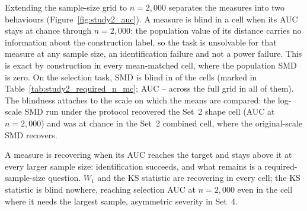 \documentclass[AMA,Times1COL]{WileyNJDv5}
\begin{document}
Extending the sample-size grid to $n = 2{,}000$ separates the measures into two behaviours (Figure~\ref{fig:study2_auc}). A measure is blind in a cell when its AUC stays at chance through $n = 2{,}000$: the population value of its distance carries no information about the construction label, so the task is unsolvable for that measure at any sample size, an identification failure and not a power failure. This is exact by construction in every mean-matched cell, where the population SMD is zero. On the selection task, SMD is blind in  of the  cells (marked in Table~\ref{tab:study2_required_n_mc}; AUC -- across the full grid in all of them). The blindness attaches to the scale on which the means are compared: the log-scale SMD run under the protocol recovered the Set~2 shape cell (AUC  at $n = 2{,}000$) and was at chance in the Set~2 combined cell, where the original-scale SMD recovers.

A measure is recovering when its AUC reaches the target and stays above it at every larger sample size: identification succeeds, and what remains is a required-sample-size question. $W_1$ and the KS statistic are recovering in every cell; the KS statistic is blind nowhere, reaching selection AUC  at $n = 2{,}000$ even in the cell where it needs the largest sample, asymmetric severity in Set~4.
\end{document}
